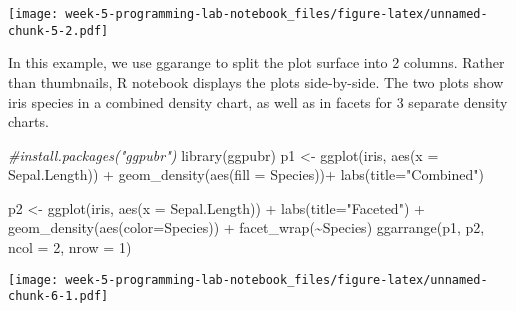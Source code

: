 \documentclass[
]{article}
\newenvironment{Shaded}{\begin{snugshade}}{\end{snugshade}}
\newcommand{\AttributeTok}[1]{\textcolor[rgb]{0.77,0.63,0.00}{#1}}
\newcommand{\CommentTok}[1]{\textcolor[rgb]{0.56,0.35,0.01}{\textit{#1}}}
\newcommand{\DecValTok}[1]{\textcolor[rgb]{0.00,0.00,0.81}{#1}}
\newcommand{\FunctionTok}[1]{\textcolor[rgb]{0.00,0.00,0.00}{#1}}
\newcommand{\NormalTok}[1]{#1}
\newcommand{\OtherTok}[1]{\textcolor[rgb]{0.56,0.35,0.01}{#1}}
\newcommand{\SpecialCharTok}[1]{\textcolor[rgb]{0.00,0.00,0.00}{#1}}
\newcommand{\StringTok}[1]{\textcolor[rgb]{0.31,0.60,0.02}{#1}}
\begin{document}
\texttt{[image: week-5-programming-lab-notebook\_files/figure-latex/unnamed-chunk-5-2.pdf]}

In this example, we use ggarange to split the plot surface into 2
columns. Rather than thumbnails, R notebook displays the plots
side-by-side. The two plots show iris species in a combined density
chart, as well as in facets for 3 separate density charts.

\begin{Shaded}
\begin{Highlighting}[]
\CommentTok{\#install.packages("ggpubr")}
\FunctionTok{library}\NormalTok{(ggpubr)}
\NormalTok{p1 }\OtherTok{\textless{}{-}} \FunctionTok{ggplot}\NormalTok{(iris, }\FunctionTok{aes}\NormalTok{(}\AttributeTok{x =}\NormalTok{ Sepal.Length)) }\SpecialCharTok{+}
  \FunctionTok{geom\_density}\NormalTok{(}\FunctionTok{aes}\NormalTok{(}\AttributeTok{fill =}\NormalTok{ Species))}\SpecialCharTok{+}
  \FunctionTok{labs}\NormalTok{(}\AttributeTok{title=}\StringTok{"Combined"}\NormalTok{) }

\NormalTok{p2 }\OtherTok{\textless{}{-}} \FunctionTok{ggplot}\NormalTok{(iris, }\FunctionTok{aes}\NormalTok{(}\AttributeTok{x =}\NormalTok{ Sepal.Length)) }\SpecialCharTok{+}
  \FunctionTok{labs}\NormalTok{(}\AttributeTok{title=}\StringTok{"Faceted"}\NormalTok{) }\SpecialCharTok{+}
  \FunctionTok{geom\_density}\NormalTok{(}\FunctionTok{aes}\NormalTok{(}\AttributeTok{color=}\NormalTok{Species)) }\SpecialCharTok{+}
  \FunctionTok{facet\_wrap}\NormalTok{(}\SpecialCharTok{\textasciitilde{}}\NormalTok{Species)}
\FunctionTok{ggarrange}\NormalTok{(p1, p2, }\AttributeTok{ncol =} \DecValTok{2}\NormalTok{, }\AttributeTok{nrow =} \DecValTok{1}\NormalTok{)}
\end{Highlighting}
\end{Shaded}

\texttt{[image: week-5-programming-lab-notebook\_files/figure-latex/unnamed-chunk-6-1.pdf]}
\end{document}
